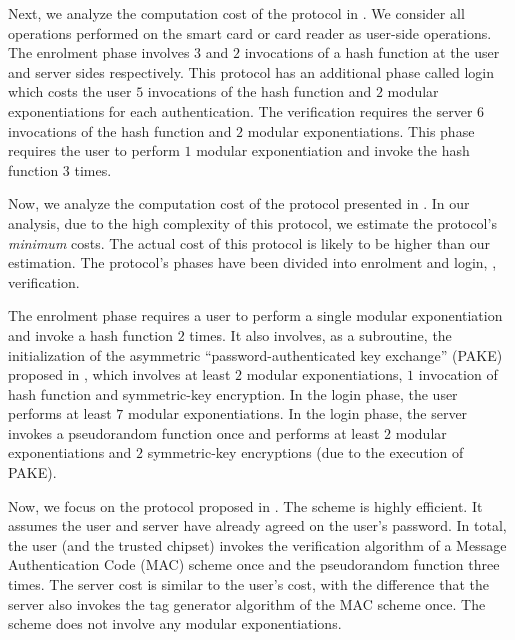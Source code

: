 Next, we analyze the computation cost of the protocol in \cite{WangW18}. We consider all operations performed on the smart card or card reader as user-side operations. The enrolment phase involves $3$ and $2$ invocations of a hash function at the user and server sides respectively. This protocol has an additional phase called login which costs the user  $5$ invocations of the hash function and $2$ modular exponentiations for each authentication.  The verification requires the server $6$ invocations of the hash function and $2$ modular exponentiations. This phase requires the user to perform $1$ modular exponentiation and invoke the hash function $3$ times. 


Now, we analyze the computation cost of the protocol presented in \cite{JareckiJKSS21}. In our analysis, due to the high complexity of this protocol, we estimate the protocol's \emph{minimum} costs. The actual cost of this protocol is likely to be higher than our estimation. The protocol's phases have been divided into enrolment and login, \ie, verification. 

The enrolment phase requires a user to perform a single modular exponentiation and invoke a hash function $2$ times. It also involves, as a subroutine, the initialization of the asymmetric  ``password-authenticated key exchange'' (PAKE) proposed in \cite{GentryMR06}, which involves at least $2$ modular exponentiations, $1$ invocation of hash function and symmetric-key encryption. In the login phase, the user performs at least $7$ modular exponentiations. In the login phase, the server invokes a pseudorandom function once and performs at least $2$ modular exponentiations and $2$ symmetric-key encryptions (due to the execution of PAKE). 

Now, we focus on the protocol proposed in \cite{MatsuoMY11}.  The scheme is highly efficient. It assumes the user and server have already agreed on the user's password. 
%
In total, the user (and the trusted chipset) invokes the verification algorithm of a Message Authentication Code (MAC) scheme once and the pseudorandom function three times. 
%
The server cost is similar to the user's cost, with the difference that the server also invokes the tag generator algorithm of the MAC scheme once. The scheme does not involve any modular exponentiations. 


